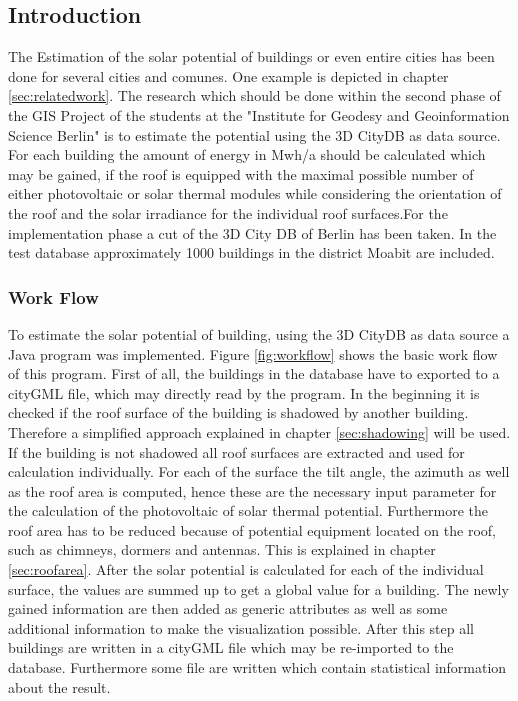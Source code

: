 
\subsection{Introduction}
The Estimation of the solar potential of buildings or even entire cities has been done for several cities and comunes. One example is depicted in chapter \ref{sec:relatedwork}. The research which should be done within the second phase of the GIS Project of the students at the "Institute for Geodesy and Geoinformation Science Berlin" is to estimate the potential using the 3D CityDB as data source. For each building the amount of energy in Mwh/a should be calculated which may be gained, if the roof is equipped with the maximal possible number of either photovoltaic or solar thermal modules while considering the orientation of the roof and the solar irradiance for the individual roof surfaces.For the implementation phase a cut of the 3D City DB of Berlin has been taken. In the test database approximately 1000 buildings in the district Moabit are included.

\subsubsection{Work Flow}
To estimate the solar potential of building, using the 3D CityDB as data source a Java program was implemented. Figure \ref{fig:workflow} shows the basic work flow of this program. First of all, the buildings in the database have to exported to a cityGML file, which may directly read by the program. In the beginning it is checked if the roof surface of the building is shadowed by another building. Therefore a simplified approach explained in chapter \ref{sec:shadowing} will be used. If the building is not shadowed all roof surfaces are extracted and used for calculation individually. For each of the surface the tilt angle, the azimuth as well as the roof area is computed, hence these are the necessary input parameter for the calculation of the photovoltaic of solar thermal potential. Furthermore the roof area has to be reduced because of potential equipment located on  the roof, such as chimneys, dormers and antennas. This is explained in chapter \ref{sec:roofarea}. After the solar potential is calculated 
for each of the individual surface, the values are summed up to get a global value for a building. The newly gained information are then added as generic attributes as well as some additional information to make the visualization possible. After this step all buildings are written in a cityGML file which may be re-imported to the database. Furthermore some file are written which contain statistical information about the result.  

